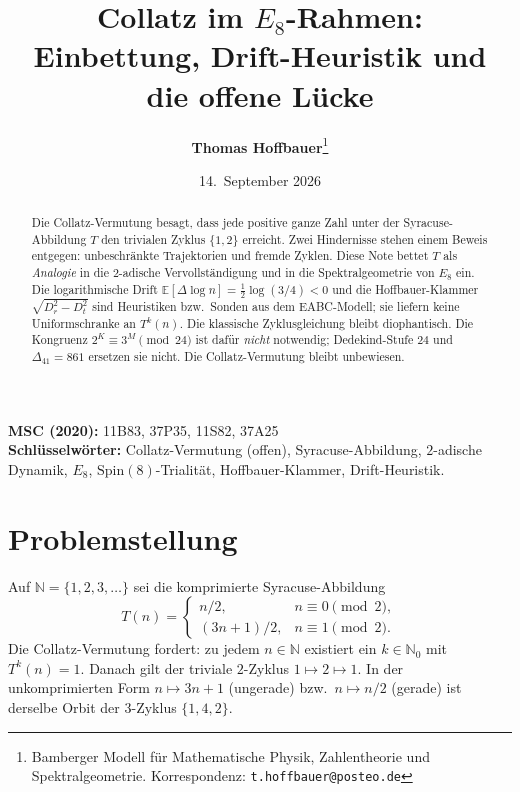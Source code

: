 \documentclass[11pt,a4paper]{article}
\title{\textbf{\texorpdfstring{Collatz im $E_8$-Rahmen:\\
Einbettung, Drift-Heuristik und die offene L\"ucke}{Collatz im E8-Rahmen: Einbettung, Drift-Heuristik und die offene Luecke}}}
\author{\textbf{Thomas Hoffbauer}\thanks{Bamberger Modell f\"ur Mathematische Physik, Zahlentheorie und Spektralgeometrie.
Korrespondenz: \texttt{t.hoffbauer@posteo.de}}}
\date{14.~September 2026}
\theoremstyle{definition}
\theoremstyle{remark}
\numberwithin{equation}{section}
\begin{document}
\maketitle

\begin{abstract}
\noindent
Die Collatz-Vermutung besagt, dass jede positive ganze Zahl unter der Syracuse-Abbildung
$T$ den trivialen Zyklus \(\{1,2\}\) erreicht.
Zwei Hindernisse stehen einem Beweis entgegen: unbeschr\"ankte Trajektorien und fremde Zyklen.
Diese Note bettet \(T\) als \emph{Analogie} in die \(2\)-adische Vervollst\"andigung und in die
Spektralgeometrie von \(E_8\) ein.
Die logarithmische Drift \(\mathbb{E}[\Delta\log n]=\tfrac12\log(3/4)<0\) und die
Hoffbauer-Klammer \(\sqrt{D_r^2-D_t^2}\) sind Heuristiken bzw.\ Sonden aus dem EABC-Modell;
sie liefern keine Uniformschranke an \(T^k(n)\).
Die klassische Zyklusgleichung bleibt diophantisch.
Die Kongruenz \(2^K\equiv 3^M\pmod{24}\) ist daf\"ur \emph{nicht} notwendig;
Dedekind-Stufe \(24\) und \(\Delta_{41}=861\) ersetzen sie nicht.
Die Collatz-Vermutung bleibt unbewiesen.
\end{abstract}

\noindent\textbf{MSC (2020):} 11B83, 37P35, 11S82, 37A25 \\
\textbf{Schl\"usselw\"orter:} Collatz-Vermutung (offen), Syracuse-Abbildung, \(2\)-adische Dynamik,
\(E_8\), \(\mathrm{Spin}(8)\)-Trialit\"at, Hoffbauer-Klammer, Drift-Heuristik.

\section{Problemstellung}

Auf \(\mathbb{N}=\{1,2,3,\dots\}\) sei die komprimierte Syracuse-Abbildung
\begin{equation}
T(n)=\begin{cases}
n/2, & n\equiv 0\pmod{2},\\[0.4em]
(3n+1)/2, & n\equiv 1\pmod{2}.
\end{cases}
\end{equation}
Die Collatz-Vermutung fordert: zu jedem \(n\in\mathbb{N}\) existiert ein \(k\in\mathbb{N}_0\) mit \(T^k(n)=1\).
Danach gilt der triviale \(2\)-Zyklus \(1\mapsto 2\mapsto 1\).
In der unkomprimierten Form \(n\mapsto 3n+1\) (ungerade) bzw.\ \(n\mapsto n/2\) (gerade)
ist derselbe Orbit der \(3\)-Zyklus \(\{1,4,2\}\).
\end{document}
